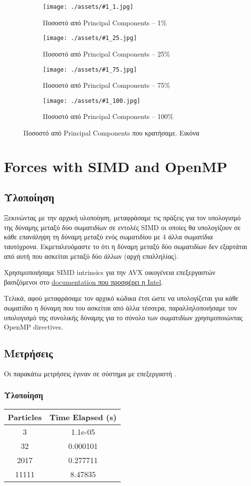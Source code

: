 \documentclass[11pt]{scrartcl} %
\newcommand{\showpcaimage}[1]{
    \begin{figure}[H]
        \centering
        \begin{subfigure}[b]{0.45\textwidth}
            \texttt{[image: ./assets/\#1\_1.jpg]}
            \caption{Ποσοστό από Principal Components -- 1\%}
        \end{subfigure}
        \begin{subfigure}[b]{0.45\textwidth}
            \texttt{[image: ./assets/\#1\_25.jpg]}
            \caption{Ποσοστό από Principal Components -- 25\%}
        \end{subfigure}
        \begin{subfigure}[b]{0.45\textwidth}
            \texttt{[image: ./assets/\#1\_75.jpg]}
            \caption{Ποσοστό από Principal Components -- 75\%}
        \end{subfigure}
        \begin{subfigure}[b]{0.45\textwidth}
            \texttt{[image: ./assets/\#1\_100.jpg]}
            \caption{Ποσοστό από Principal Components -- 100\%}
        \end{subfigure}
        \caption{Ποσοστό από Principal Components που κρατήσαμε. Εικόνα \src{#1.jpg}}
    \end{figure}
}
\begin{document}
\showpcaimage{elvis}

\section{Forces with SIMD and OpenMP}

\subsection{Υλοποίηση}

Ξεκινώντας με την αρχική υλοποίηση, μεταφράσαμε τις πράξεις για τον υπολογισμό της δύναμης μεταξύ δύο σωματιδίων σε εντολές SIMD 
οι οποίες θα υπολογίζουν σε κάθε επανάληψη τη δύναμη μεταξύ ενός σωματιδίου με 4 άλλα σωματίδια ταυτόχρονα. 
Εκμεταλευόμαστε το ότι η δύναμη μεταξύ δύο σωματιδίων δεν εξαρτάται από αυτή που ασκείται μεταξύ δύο άλλων (αρχή επαλληλίας).

Χρησιμοποιήσαμε SIMD intrinsics για την AVX οικογένεια επεξεργαστών βασιζόμενοι στο \href{https://www.intel.com/content/www/us/en/docs/intrinsics-guide/index.html#text=mm256_loadu_pd&ig_expand=4488&techs=AVX_ALL}{documentation που προσφέρει η Intel}.

Τελικά, αφού μεταφράσαμε τον αρχικό κώδικα έτσι ώστε να υπολογίζεται για κάθε σωματίδιο η δύναμη που του ασκείται
από άλλα τέσσερα, παραλληλοποιήσαμε τον υπολογισμό της συνολικής δύναμης για το σύνολο των σωματιδίων χρησιμοποιώντας 
OpenMP directives.

\subsection{Μετρήσεις}

Οι παρακάτω μετρήσεις έγιναν σε σύστημα με επεξεργαστή .

\subsubsection{ Υλοποίηση}

\begin{table}[H]
    \centering
    \begin{tabular}{|c|c|}
    \hline
        \textbf{Particles} & \textbf{Time Elapsed (s)} \\ \hline
        3     & 1.1e-05  \\ \hline 
        32    & 0.000101 \\ \hline
        2017  & 0.277711 \\ \hline
        11111 & 8.47835  \\ \hline
    \end{tabular}
\end{table}
\end{document}
